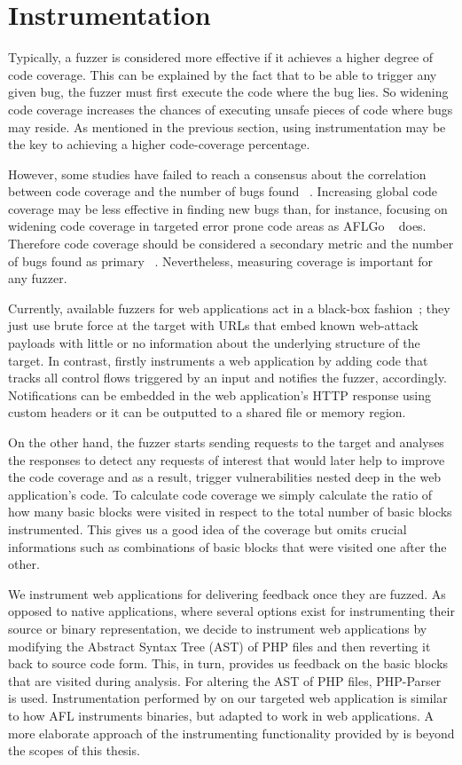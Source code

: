 \section{Instrumentation}
Typically, a fuzzer is considered more effective if it achieves a higher degree of code coverage. This can be explained by the fact that to be able to trigger any given bug, the fuzzer must first execute the code where the bug lies. So widening code coverage increases the chances of executing unsafe pieces of code where bugs may reside. As mentioned in the previous section, using instrumentation may be the key to achieving a higher code-coverage percentage. 

However, some studies have failed to reach a consensus about the correlation between code coverage and the number of bugs found ~\cite{klees2018Evaluation,coverage2014effectiveness}. 
Increasing global code coverage may be less effective in finding new bugs than, for instance, focusing on widening code coverage in targeted error prone code areas as AFLGo ~\cite{bohme2017directed} does. Therefore code coverage should be considered a secondary metric and the number of bugs found as primary ~\cite{klees2018Evaluation}. Nevertheless, measuring coverage is important for any fuzzer.

Currently, available fuzzers for web applications act in a black-box fashion~\cite{doupe2010johnny}; they just use brute force at the target with URLs that embed known web-attack payloads with little or no information about the underlying structure of the target. 
In contrast, \pname firstly instruments a web application by adding code that tracks all control flows triggered by an input and notifies the fuzzer, accordingly. Notifications can be embedded in the web application's HTTP response using custom headers or it can be outputted to a shared file or memory region. 

On the other hand, the fuzzer starts sending requests to the target and analyses the responses to detect any requests of interest that would later help to improve the code coverage and as a result, trigger vulnerabilities nested deep in the web application's code. To calculate code coverage we simply calculate the ratio of how many basic blocks were visited in respect to the total number of basic blocks instrumented. This gives us a good idea of the coverage but omits crucial informations such as combinations of basic blocks that were visited one after the other.

We instrument web applications for delivering feedback once
they are fuzzed. As opposed to native applications, where
several options exist for instrumenting their source or binary
representation, we decide to instrument web applications by
modifying the Abstract Syntax Tree (AST) of PHP files and then reverting it back to source code form. This, in turn, provides us feedback on the basic blocks that are visited during analysis. For altering the AST of PHP files, PHP-Parser ~\cite{nikicPhpParser} is used. 
Instrumentation performed by \pname on our targeted web application is similar to how AFL instruments binaries, but adapted to work in web applications. A more elaborate approach of the instrumenting functionality provided by \pname is beyond the scopes of this thesis.

